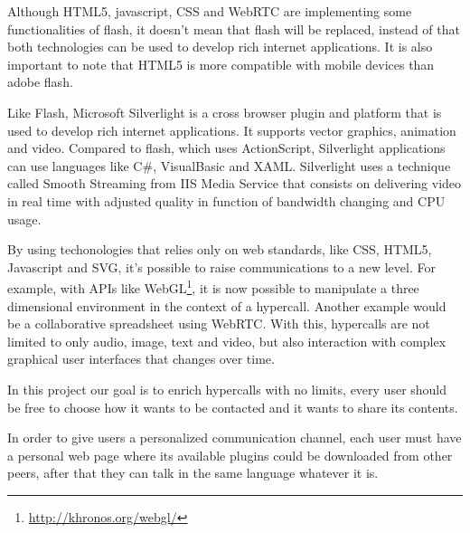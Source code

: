   Although \ac{HTML}5, javascript, \ac{CSS} and \ac{WebRTC} are implementing some functionalities of flash, it doesn't mean that flash will be replaced, instead of that both technologies can be used to develop rich internet applications. It is also important to note that \ac{HTML}5 is more compatible with mobile devices than adobe flash. 

  Like Flash, Microsoft Silverlight is a cross browser plugin and platform that is used to develop rich internet applications. It supports vector graphics, animation and video. Compared to flash, which uses ActionScript, Silverlight applications can use languages like C\#, VisualBasic and \ac{XAML}. Silverlight uses a technique called Smooth Streaming from IIS Media Service that consists on delivering video in real time with adjusted quality in function of bandwidth changing and \ac{CPU} usage.



  By using techonologies that relies only on web standards, like \ac{CSS}, \ac{HTML}5, Javascript and \ac{SVG}, it's possible to raise communications to a new level. For example, with \ac{API}s like WebGL\footnote{\url{http://khronos.org/webgl/}}, it is now possible to manipulate a three dimensional environment in the context of a hypercall. Another example would be a collaborative spreadsheet using WebRTC. With this, hypercalls are not limited to only audio, image, text and video, but also interaction with complex graphical user interfaces that changes over time.

  In this project our goal is to enrich hypercalls with no limits, every user should be free to choose how it wants to be contacted and it wants to share its contents.

  In order to give users a personalized communication channel, each user must have a personal web page where its available plugins could be downloaded from other peers, after that they can talk in the same language whatever it is.
